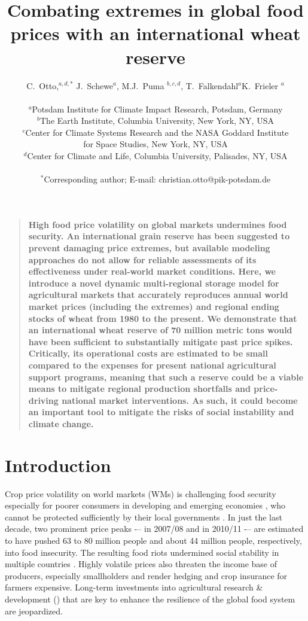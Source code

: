 \documentclass[12pt]{article}
\title{Combating extremes in global food prices with an international wheat reserve}
\author
{C.~Otto,$^{a,d,\ast}$ J.~Schewe$^{a}$, M.J.~Puma $^{b,c,d}$, T.~Falkendahl$^{a}$K.~Frieler $^{a}$\\
  \\
  \normalsize{ $^{a}$Potsdam Institute for Climate Impact Research, Potsdam, Germany}\\
  \normalsize{ $^{b}$The Earth Institute, Columbia University, New York, NY, USA}\\
  \normalsize{ $^{c}$Center for Climate Systems Research and the NASA Goddard Institute}\\
  \normalsize{for Space Studies, New York, NY, USA}\\
  \normalsize{$^{d}$Center for Climate and Life, Columbia University, Palisades, NY, USA}\\
  \\
  \normalsize{$^\ast$Corresponding author; E-mail: christian.otto@pik-potsdam.de} }
\date{}
\newenvironment{natabstract}{%
\begin{quote} \bf}
{\end{quote}}
\begin{document}
 




\maketitle 

\begin{natabstract} %
High food price volatility on global markets undermines food security. An international grain reserve has been suggested to prevent damaging price extremes, but available modeling approaches do not allow for reliable assessments of its effectiveness under real-world market conditions. Here, we introduce a novel dynamic multi-regional storage model for agricultural markets that accurately reproduces annual world market prices (including the extremes) and regional ending stocks of wheat from 1980 to the present. We demonstrate that an international wheat reserve of 70 million metric tons would have been sufficient to substantially mitigate past price spikes. Critically, its operational costs are estimated to be small compared to the expenses for present national agricultural support programs, meaning that such a reserve could be a viable means to mitigate regional production shortfalls and price-driving national market interventions. As such, it could become an important tool to mitigate the risks of social instability and climate change.
\end{natabstract}


\section*{Introduction}
Crop price volatility on world markets (WMs) is challenging food security especially for poorer consumers in developing and emerging economies \cite{BRA08}, who cannot be protected sufficiently by their local governments \cite{HLPE11}. In just the last decade, two prominent price peaks -– in 2007/08 and in 2010/11 -– are estimated to have pushed 63 \cite{TIW10} to 80 \cite{FAO08} million people and about 44 million people, respectively, into food insecurity. The resulting food riots undermined social stability in multiple countries \cite{BER13}. Highly volatile prices also threaten the income base of producers, especially smallholders \cite{HLPE11} and render hedging and crop insurance for farmers expensive. Long-term investments into agricultural research \& development (\RD) that are key to enhance the resilience of the global food system \cite{GOD10,FED10} are jeopardized.
\end{document}
